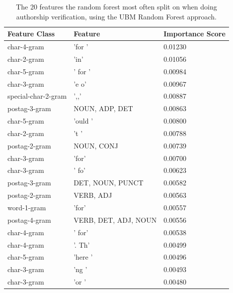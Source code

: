 \begin{table}
    \centering
    \begin{tabular}{lll}
        \textbf{Feature Class} & \textbf{Feature}     & \textbf{Importance Score} \\
        \hline
        char-4-gram            & 'for '               & 0.01230                   \\
        char-2-gram            & 'in'                 & 0.01056                   \\
        char-5-gram            & ' for '              & 0.00984                   \\
        char-3-gram            & 'e o'                & 0.00967                   \\
        special-char-2-gram    & ',,'                 & 0.00887                   \\
        postag-3-gram          & NOUN, ADP, DET       & 0.00863                   \\
        char-5-gram            & 'ould '              & 0.00800                   \\
        char-2-gram            & 't '                 & 0.00788                   \\
        postag-2-gram          & NOUN, CONJ           & 0.00739                   \\
        char-3-gram            & 'for'                & 0.00700                   \\
        char-3-gram            & ' fo'                & 0.00623                   \\
        postag-3-gram          & DET, NOUN, PUNCT     & 0.00582                   \\
        postag-2-gram          & VERB, ADJ            & 0.00563                   \\
        word-1-gram            & 'for'                & 0.00557                   \\
        postag-4-gram          & VERB, DET, ADJ, NOUN & 0.00556                   \\
        char-4-gram            & ' for'               & 0.00538                   \\
        char-4-gram            & '. Th'               & 0.00499                   \\
        char-5-gram            & 'here '              & 0.00496                   \\
        char-3-gram            & 'ng '                & 0.00493                   \\
        char-3-gram            & 'or '                & 0.00480
    \end{tabular}
    \caption{The 20 features the random forest most often split on when doing
    authorship verification, using the \gls{UBM} Random Forest approach.}
    \label{tab:feature_importance}
\end{table}


